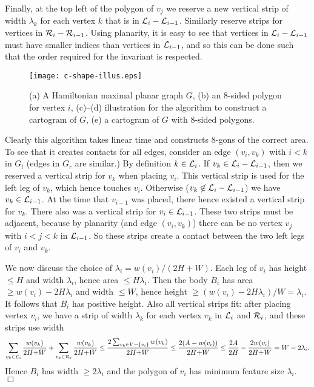 \documentclass[11pt]{article}
\newcommand{\calL}{\ensuremath{{\cal L}}}
\newcommand{\calR}{\ensuremath{{\cal R}}}
\newenvironment{proof}{{\bf Proof:} }{\hspace*{\fill}$\Box$\vspace{2mm}}
\begin{document}
\begin{proof}
Finally, at the top left of the
polygon of $v_j$ we reserve a new vertical
strip of width $\lambda_k$ for each vertex $k$ that is in $\calL_i-\calL_{i-1}$.
Similarly reserve strips for vertices in $\calR_i-\calR_{i-1}$.   Using
planarity, it is easy to see that vertices in $\calL_i-\calL_{i-1}$ must have smaller
indices than vertices in $\calL_{i-1}$, and so this can be done such that the
order required for the invariant is respected.

\begin{figure}[htbp]
\centering
\texttt{[image: c-shape-illus.eps]}
\caption{\small\sf (a) A Hamiltonian maximal planar graph $G$, (b) an 8-sided polygon for vertex $i$, (c)--(d) illustration
 for the algorithm to construct a cartogram of $G$, (e) a cartogram of $G$ with 8-sided polygons.}
\label{fig:c-shape-illus}
\end{figure}

Clearly this algorithm takes linear time and constructs 8-gons of the
correct area.  To see that it creates contacts for all edges, consider
an edge $(v_i,v_k)$ with $i<k$ in $G_l$ (edges in $G_r$ are similar.)
By definition $k\in \calL_i$.  If $v_k\in \calL_i-\calL_{i-1}$,
then we reserved a vertical strip for $v_k$ when placing $v_i$.  This
vertical strip is used for the left leg of $v_k$, which hence touches $v_i$.
Otherwise ($v_k\not\in \calL_i-\calL_{i-1}$)
we have $v_k\in \calL_{i-1}$. At the time that $v_{i-1}$ was placed, there
hence existed a vertical strip for $v_k$.
There also was a vertical strip for $v_i\in \calL_{i-1}$.
These two strips must be adjacent, because
by planarity (and edge $(v_i,v_k)$) there can
be no vertex $v_j$ with $i<j<k$ in $\calL_{i-1}$.
So these strips create a contact between the two left legs of $v_i$ and $v_k$.

We now discuss the choice of $\lambda_i=w(v_i)/(2H+W)$.
Each leg of $v_i$ has height $\leq H$ and width $\lambda_i$, hence area
$\leq H\lambda_i$.  Then the body $B_i$ has area $\geq w(v_i)-2H\lambda_i$
and width $\leq W$, hence height $\geq (w(v_i)-2H\lambda_i)/W=\lambda_i$.
It follows that $B_i$ has positive height.  Also all vertical
strips fit:  after placing vertex $v_i$, we have a strip of width $\lambda_k$
for each vertex $v_k$ in $\calL_i$ and $\calR_i$, and  these
strips use width
$$ \sum_{v_k\in \calL_i} \frac{w(v_k)}{2H{+}W} + \sum_{v_k\in \calR_i} \frac{w(v_k)}{2H{+}W}
\leq \frac{2\sum_{v_k\in V-\{v_i\}} w(v_k)} {2H{+}W}
\leq \frac{2(A-w(v_i))} {2H{+}W}
\leq \frac{2A}{2H} - \frac{2w(v_i)}{2H{+}W} = W-2\lambda_i.$$
Hence $B_i$ has width $\geq 2\lambda_i$ and the polygon
of $v_i$ has minimum feature size $\lambda_i$.
\end{proof}
\end{document}
